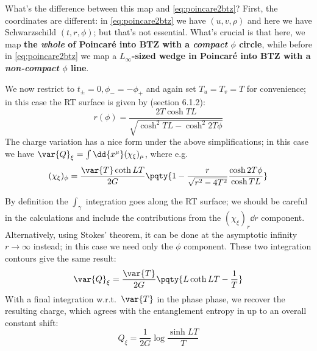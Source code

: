 \documentclass[a4paper
	,10pt
]{article}
\begin{document}
	What's the difference between this map and \eqref{eq:poincare2btz}? First, the coordinates are different: in \eqref{eq:poincare2btz} we have $(u,v,\rho)$ and here we have Schwarzschild $(t,r,\phi)$; but that's not essential. What's crucial is that here, we map \textbf{the \textsl{whole} of Poincar\'e into BTZ with a \textsl{compact} $\phi$ circle}, while before in \eqref{eq:poincare2btz} we map a \textbf{$L_\infty$-sized wedge in Poincar\'e into BTZ with a \textsl{non-compact} $\phi$ line}. 
	
	We now restrict to $t_\pm = 0, \phi_- = -\phi_+$ and again set $T_u = T_v = T$ for convenience; in this case the RT surface is given by \textcite{Rangamani:2016dms} (section 6.1.2):
	\begin{equation}
		r(\phi) = \frac{2T\cosh TL}{
				\sqrt{\cosh^2 TL - \cosh^2 2T\phi}
			}
	\end{equation}
	The charge variation has a nice form under the above simplifications; in this case we have $
		\var{Q}_{\xi}
		= \int \dd{x^\mu} (\chi_\xi)_\mu
	$, where e.g.
	\begin{equation}
		(\chi_\xi)_\phi
		= \frac{\var{T} \coth LT}{2G}
			\pqty{
				1 - {\frac{r}{\sqrt{r^2 - 4T^2}}}
				\frac{\cosh 2T\phi}{\cosh TL}
			}
	\end{equation}
	
	By definition the $\int_\gamma$ integration goes along the RT surface; we should be careful in the calculations and include the contributions from the $(\chi_\xi)_r \dd{r}$ component. 
	Alternatively, using Stokes' theorem, it can be done at the asymptotic infinity $r\to\infty$ instead; in this case we need only the $\phi$ component. These two integration contours give the same result:
	\begin{equation}
		\var{Q}_\xi
		= \frac{\var{T}}{2G} \pqty{
				L \coth LT - \frac{1}{T}
			}
	\end{equation}
	With a final integration w.r.t.~$\var{T}$ in the phase phase, we recover the resulting charge, which agrees with the entanglement entropy in \cite{Rangamani:2016dms} up to an overall constant shift:
	\begin{equation}
		Q_\xi = \frac{1}{2G} \log \frac{\sinh LT}{T}
	\end{equation}
	
\end{document}
